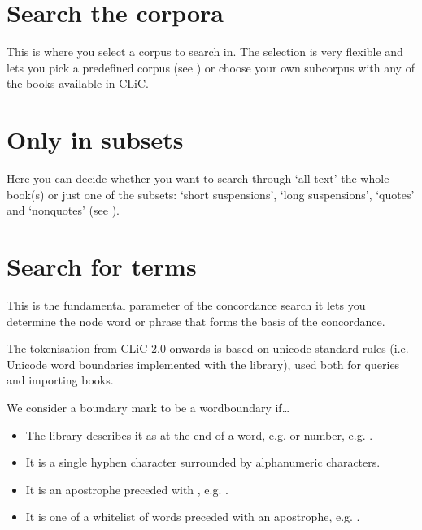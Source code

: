 \documentclass[letterpaper,10pt,english]{sphinxmanual}
\begin{document}
\section{Search the corpora}
\label{\detokenize{clicanalysis/concordance:search-the-corpora}}
\sphinxAtStartPar
This is where you select a corpus to search in. The
selection is very flexible and lets you pick a pre\sphinxhyphen{}defined corpus (see {\hyperref[\detokenize{cliccorpora:the-clic-corpora}]{}})
or choose your own subcorpus \textendash{} with any of the books available in CLiC.


\section{Only in subsets}
\label{\detokenize{clicanalysis/concordance:only-in-subsets}}
\sphinxAtStartPar
Here you can decide whether you want to search through ‘all text’ \textendash{} the
whole book(s) \textendash{} or just one of the subsets: ‘short suspensions’, ‘long
suspensions’, ‘quotes’ and ‘non\sphinxhyphen{}quotes’ (see {\hyperref[\detokenize{cliccorpora:the-clic-corpora}]{}}).


\section{Search for terms}
\label{\detokenize{clicanalysis/concordance:search-for-terms}}
\sphinxAtStartPar
This is the fundamental parameter of the concordance search \textendash{} it lets
you determine the node word or phrase that forms the basis of the
concordance.

\sphinxAtStartPar
The tokenisation from CLiC 2.0 onwards is based on unicode standard rules
(i.e. Unicode word boundaries implemented with the  library), used
both for queries and importing books.

\sphinxAtStartPar
We consider a boundary mark to be a word\sphinxhyphen{}boundary if…
\begin{itemize}
\item {} 
\sphinxAtStartPar
The  library describes it as at the end of a word, e.g.  or number, e.g. .

\item {} 
\sphinxAtStartPar
It is a single hyphen character surrounded by alpha\sphinxhyphen{}numeric characters.

\item {} 
\sphinxAtStartPar
It is an apostrophe preceded with , e.g. .

\item {} 
\sphinxAtStartPar
It is one of a whitelist of words preceded with an apostrophe, e.g. .

\end{itemize}
\end{document}
